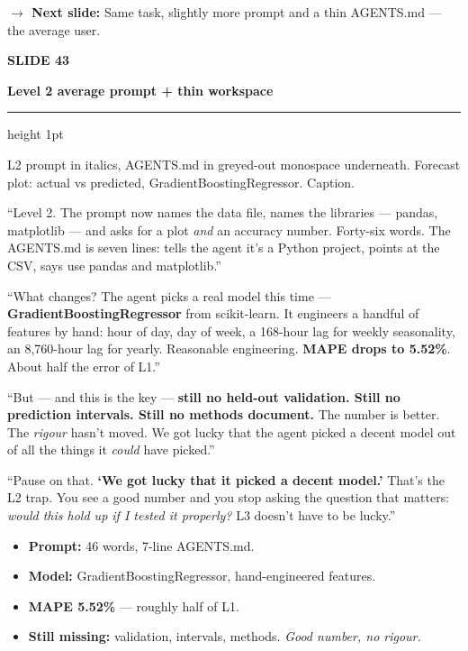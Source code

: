 \documentclass[11pt,a4paper]{article}
\newcommand{\slidehead}[2]{%
  \vspace{2pt}%
  {\small\color{mutedgrey}\textbf{SLIDE #1}}\par
  {\LARGE\color{jrcblue}\bfseries #2}\par
  \vspace{6pt}%
  {\color{jrcblue}\hrule height 1pt}%
  \vspace{8pt}%
}
\newcommand{\block}[1]{\par\vspace{4pt}{\small\color{jrcblue}\textbf{\MakeUppercase{#1}}}\par\vspace{2pt}}
\newenvironment{anchors}{%
  \begin{tcolorbox}[colback=jrcblue!6, colframe=jrcblue!50, boxrule=0.6pt, arc=2pt,
                    left=10pt, right=10pt, top=6pt, bottom=6pt, fontupper=\small,
                    title={\bfseries Anchor facts}, coltitle=jrcblue,
                    fonttitle=\small\bfseries, attach title to upper,
                    after title={\par\vspace{2pt}}]
}{%
  \end{tcolorbox}
}
\newenvironment{sayblock}{%
  \begin{tcolorbox}[colback=cardbg, colframe=jrcblue, boxrule=0.8pt, arc=2pt,
                    left=10pt, right=10pt, top=6pt, bottom=6pt, fontupper=\normalsize,
                    title={\bfseries Say this}, coltitle=white, colbacktitle=jrcblue,
                    fonttitle=\small\bfseries]
}{%
  \end{tcolorbox}
}
\newcommand{\transition}[1]{%
  \par\vspace{4pt}%
  \begin{tcolorbox}[colback=white, colframe=mutedgrey!40, boxrule=0.5pt, arc=2pt,
                    left=10pt, right=10pt, top=4pt, bottom=4pt, fontupper=\small]
    {\color{mutedgrey}\textbf{\textsf{$\to$ Next slide:}}} #1
  \end{tcolorbox}
}
\begin{document}
\transition{Same task, slightly more prompt and a thin AGENTS.md — the
average user.}

\newpage

\slidehead{43}{Level 2 \textendash{} average prompt + thin workspace}

\block{On screen}
L2 prompt in italics, AGENTS.md in greyed-out monospace underneath. Forecast
plot: actual vs predicted, GradientBoostingRegressor. Caption.

\begin{sayblock}
``Level 2. The prompt now names the data file, names the libraries — pandas,
matplotlib — and asks for a plot \emph{and} an accuracy number. Forty-six
words. The AGENTS.md is seven lines: tells the agent it's a Python project,
points at the CSV, says use pandas and matplotlib.''\par\vspace{6pt}

``What changes? The agent picks a real model this time —
\textbf{GradientBoostingRegressor} from scikit-learn. It engineers a handful
of features by hand: hour of day, day of week, a 168-hour lag for weekly
seasonality, an 8,760-hour lag for yearly. Reasonable engineering.
\textbf{MAPE drops to 5.52\%}. About half the error of L1.''\par\vspace{4pt}

``But — and this is the key — \textbf{still no held-out validation. Still no
prediction intervals. Still no methods document.} The number is better. The
\emph{rigour} hasn't moved. We got lucky that the agent picked a decent model
out of all the things it \emph{could} have picked.''\par\vspace{4pt}

``Pause on that. \textbf{`We got lucky that it picked a decent model.'} That's
the L2 trap. You see a good number and you stop asking the question that
matters: \textit{would this hold up if I tested it properly?} L3 doesn't have
to be lucky.''
\end{sayblock}

\begin{anchors}
\begin{itemize}
\item \textbf{Prompt:} 46 words, 7-line AGENTS.md.
\item \textbf{Model:} GradientBoostingRegressor, hand-engineered features.
\item \textbf{MAPE 5.52\%} — roughly half of L1.
\item \textbf{Still missing:} validation, intervals, methods. \emph{Good number, no rigour.}
\end{itemize}
\end{anchors}
\end{document}

